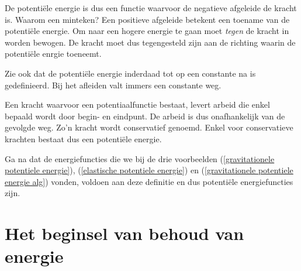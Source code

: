 
De potenti\"ele energie is dus een functie waarvoor de negatieve afgeleide de kracht is. Waarom een minteken? Een positieve afgeleide betekent een toename van de potenti\"ele energie. Om naar een hogere energie te gaan moet \textit{tegen} de kracht in worden bewogen. De kracht moet dus tegengesteld zijn aan de richting waarin de potenti\"ele enrgie toeneemt.

Zie ook dat de potenti\"ele energie inderdaad tot op een constante na is ge\-de\-fi\-ni\-eerd. Bij het afleiden valt immers een constante weg.

Een kracht waarvoor een potentiaalfunctie bestaat, levert arbeid die enkel bepaald wordt door begin- en eindpunt. De arbeid is dus onafhankelijk van de gevolgde weg. Zo'n kracht wordt conservatief genoemd. Enkel voor conservatieve krachten bestaat dus een potenti\"ele energie.

Ga na dat de energiefuncties die we bij de drie voorbeelden (\ref{gravitationele potentiele energie}), (\ref{elastische potentiele energie}) en (\ref{gravitationele potentiele energie
alg}) vonden, voldoen aan deze definitie en dus potenti\"ele energiefuncties zijn.


\section{Het beginsel van behoud van energie}\label{beginsel_behoud_energie}

